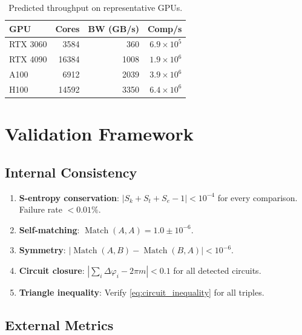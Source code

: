 \documentclass[11pt,twocolumn,a4paper]{article}
\newcommand{\Sk}{S_k}
\newcommand{\St}{S_t}
\newcommand{\Se}{S_e}
\DeclareMathOperator{\Match}{Match}
\begin{document}
\begin{table}[t]
\centering
\caption{Predicted throughput on representative GPUs.}
\label{tab:throughput}
\begin{tabular}{lrrr}
\toprule
\textbf{GPU} & \textbf{Cores} & \textbf{BW (GB/s)} & \textbf{Comp/s} \\
\midrule
RTX 3060 & 3584 & 360 & $6.9 \times 10^5$ \\
RTX 4090 & 16384 & 1008 & $1.9 \times 10^6$ \\
A100 & 6912 & 2039 & $3.9 \times 10^6$ \\
H100 & 14592 & 3350 & $6.4 \times 10^6$ \\
\bottomrule
\end{tabular}
\end{table}


\section{Validation Framework}
\label{sec:validation}

\subsection{Internal Consistency}

\begin{enumerate}[nosep]
  \item \textbf{S-entropy conservation}: $|\Sk + \St + \Se - 1| < 10^{-4}$
    for every comparison. Failure rate $< 0.01\%$.
  \item \textbf{Self-matching}: $\Match(A, A) = 1.0 \pm 10^{-6}$.
  \item \textbf{Symmetry}: $|\Match(A,B) - \Match(B,A)| < 10^{-6}$.
  \item \textbf{Circuit closure}: $|\sum_i \Delta\varphi_i - 2\pi m|
    < 0.1$ for all detected circuits.
  \item \textbf{Triangle inequality}: Verify
    \eqref{eq:circuit_inequality} for all triples.
\end{enumerate}

\subsection{External Metrics}
\end{document}
